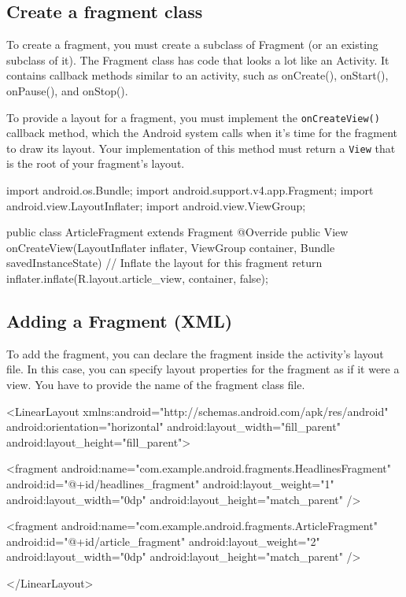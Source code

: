 \subsection{Create a fragment class}

To create a fragment, you must create a subclass of Fragment (or an existing subclass of it). The Fragment class has code that looks a lot like an Activity. It contains callback methods similar to an activity, such as onCreate(), onStart(), onPause(), and onStop().

To provide a layout for a fragment, you must implement the \texttt{onCreateView()} callback method, which the Android system calls when it's time for the fragment to draw its layout. Your implementation of this method must return a \texttt{View} that is the root of your fragment's layout.


\begin{android}
	import android.os.Bundle;
	import android.support.v4.app.Fragment;
	import android.view.LayoutInflater;
	import android.view.ViewGroup;
	
	public class ArticleFragment extends Fragment {
		@Override
		public View onCreateView(LayoutInflater inflater, ViewGroup container,
		Bundle savedInstanceState) {
			// Inflate the layout for this fragment
			return inflater.inflate(R.layout.article_view, container, false);
		}
	}
\end{android}

\subsection{Adding a Fragment (XML)}
To add the fragment, you can
declare the fragment inside the activity's layout file.
	In this case, you can specify layout properties for the fragment as if it were a view. You have to provide the name of the fragment class file.


\begin{xml}
	<LinearLayout xmlns:android="http://schemas.android.com/apk/res/android"
	android:orientation="horizontal"
	android:layout_width="fill_parent"
	android:layout_height="fill_parent">
	
	<fragment android:name="com.example.android.fragments.HeadlinesFragment"
	android:id="@+id/headlines_fragment"
	android:layout_weight="1"
	android:layout_width="0dp"
	android:layout_height="match_parent" />
	
	<fragment android:name="com.example.android.fragments.ArticleFragment"
	android:id="@+id/article_fragment"
	android:layout_weight="2"
	android:layout_width="0dp"
	android:layout_height="match_parent" />
	
	</LinearLayout>
\end{xml}

